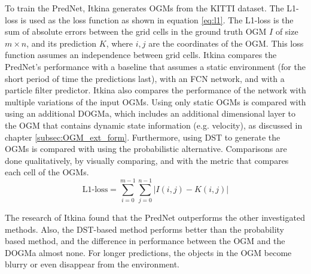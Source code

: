 To train the PredNet, Itkina \cite{itkina2019dynamic} generates \glspl{OGM} from the \gls{KITTI} \cite{geiger2013vision} dataset. The L1-loss is used as the loss function as shown in equation \ref{eq:l1}. The L1-loss is the sum of absolute errors between the grid cells in the ground truth \gls{OGM} $I$ of size $m \times n$, and its prediction $K$, where $i, j$ are the coordinates of the \gls{OGM}. This loss function assumes an independence between grid cells. Itkina \cite{itkina2019dynamic} compares the PredNet's performance with a baseline that assumes a static environment (for the short period of time the predictions last), with an FCN network, and with a particle filter predictor. Itkina \cite{itkina2019dynamic} also compares the performance of the network with multiple variations of the input \glspl{OGM}. Using only static \glspl{OGM} is compared with using an additional \gls{DOGMa}, which includes an additional dimensional layer to the \gls{OGM} that contains dynamic state information (e.g. velocity), as discussed in chapter \ref{subsec:OGM_ext_form}. Furthermore, using \gls{DST} to generate the \glspl{OGM} is compared with using the probabilistic alternative. Comparisons are done qualitatively, by visually comparing, and with the  metric that compares each cell of the \glspl{OGM}.  \\

\begin{equation} \label{eq:l1}
	\text{L1-loss} = \sum_{i=0}^{m-1}\sum_{j=0}^{n-1}|I(i,j)-K(i,j)|
\end{equation}

The research of Itkina \cite{itkina2019dynamic} found that the PredNet outperforms the other investigated methods. Also, the \gls{DST}-based method performs better than the probability based method, and the difference in performance between the \gls{OGM} and the \gls{DOGMa} almost none. For longer predictions, the objects in the \gls{OGM} become blurry or even disappear from the environment. \\

